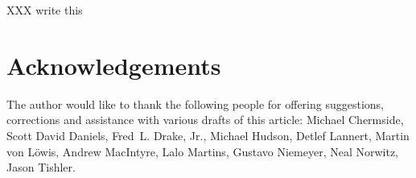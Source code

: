 \documentclass{howto}
\begin{document}
XXX write this


\section{Acknowledgements \label{acks}}

The author would like to thank the following people for offering
suggestions, corrections and assistance with various drafts of this
article: Michael Chermside, Scott David Daniels, Fred~L. Drake, Jr.,
Michael Hudson, Detlef Lannert, Martin von L\"owis, Andrew MacIntyre,
Lalo Martins, Gustavo Niemeyer, Neal Norwitz, Jason Tishler.
\end{document}
